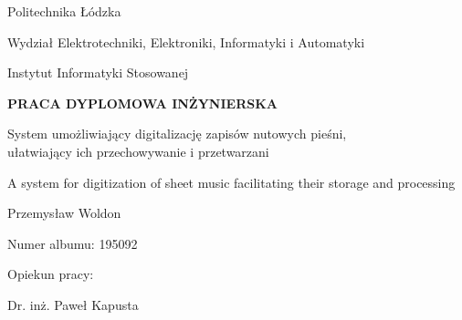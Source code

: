 \documentclass[a4paper,12pt]{article}
\author{Przemysław Woldon}
\date{}
\begin{document}
    \begingroup
        \fontsize{12pt}{0.2}\selectfont
            \begin{center}Politechnika Łódzka\end{center}
            \begin{center}Wydział Elektrotechniki, Elektroniki, Informatyki i Automatyki\end{center} 
            \begin{center}Instytut Informatyki Stosowanej\end{center} 
        
        \vspace*{125px}     
    
        \fontsize{14pt}{0.2}\selectfont
            \begin{center}\textbf{PRACA DYPLOMOWA INŻYNIERSKA}\end{center} 

        \vspace*{50px}

        \fontsize{12pt}{0.2}\selectfont
            \begin{center}System umożliwiający digitalizację zapisów nutowych pieśni, \\\vspace{3mm} ułatwiający ich przechowywanie i przetwarzani\end{center} \vspace{5mm}
            \begin{center}A system for digitization of sheet music facilitating their storage and processing\end{center} 

        \vspace*{50px}

        \fontsize{12pt}{0.2}\selectfont 
            \begin{center}Przemysław Woldon\end{center} 
            \begin{center}Numer albumu: 195092\end{center} 

        \vspace*{70px}
        
        \fontsize{12pt}{0.2}\selectfont 
            \begin{flushright}Opiekun pracy:\end{flushright} 
            \begin{flushright}Dr. inż. Paweł Kapusta\end{flushright} 
    
\end{document}

